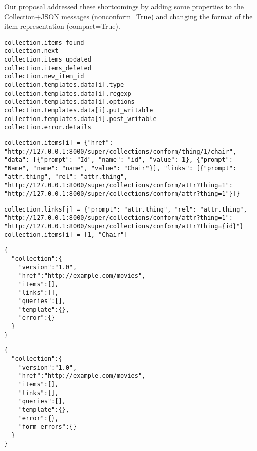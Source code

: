 \documentclass[12pt]{article}
\begin{document}
Our proposal addressed these shortcomings by adding some properties to the Collection+JSON messages (nonconform=True) and changing the format of the item representation (compact=True).

\begin{verbatim}
collection.items_found
collection.next
collection.items_updated
collection.items_deleted
collection.new_item_id
collection.templates.data[i].type
collection.templates.data[i].regexp
collection.templates.data[i].options
collection.templates.data[i].put_writable
collection.templates.data[i].post_writable
collection.error.details
\end{verbatim}

\begin{verbatim}
collection.items[i] = {"href": "http://127.0.0.1:8000/super/collections/conform/thing/1/chair", "data": [{"prompt": "Id", "name": "id", "value": 1}, {"prompt": "Name", "name": "name", "value": "Chair"}], "links": [{"prompt": "attr.thing", "rel": "attr.thing", "http://127.0.0.1:8000/super/collections/conform/attr?thing=1": "http://127.0.0.1:8000/super/collections/conform/attr?thing=1"}]} 
\end{verbatim}

\begin{verbatim}
collection.links[j] = {"prompt": "attr.thing", "rel": "attr.thing", "http://127.0.0.1:8000/super/collections/conform/attr?thing=1": "http://127.0.0.1:8000/super/collections/conform/attr?thing={id}"}
collection.items[i] = [1, "Chair"]
\end{verbatim}

\begin{verbatim}
{
  "collection":{
    "version":"1.0",
    "href":"http://example.com/movies",
    "items":[],
    "links":[],
    "queries":[],
    "template":{},
    "error":{}
  }
}
\end{verbatim}

\begin{verbatim}
{
  "collection":{
    "version":"1.0",
    "href":"http://example.com/movies",
    "items":[],
    "links":[],
    "queries":[],
    "template":{},
    "error":{},
    "form_errors":{}
  }
}
\end{verbatim}
\end{document}
